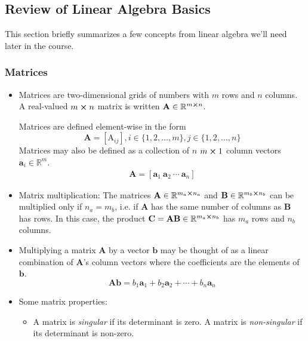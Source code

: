\documentclass[11pt, a4paper]{article}
\newcommand{\R}{\mathbb{R}} %
\newcommand{\mat}[1]{\mathbf{#1}} %
\begin{document}
\subsection{Review of Linear Algebra Basics}
This section briefly summarizes a few concepts from linear algebra we'll need later in the course.
\subsubsection{Matrices}
\begin{itemize}
	\item Matrices are two-dimensional grids of numbers with $ m $ rows and $ n $ columns. A real-valued $ m \cross n $ matrix is written $ \mat{A} \in \R^{m\cross n} $. 
	
	Matrices are defined element-wise in the form 
	\begin{equation*}
		 \mat{A} = [\mathrm{A}_{ij}],  i \in \{1, 2, \dots, m\}, j \in \{1,2, \dots, n\} 
	\end{equation*}
	Matrices may also be defined as a collection of $ n $  $ m \cross 1 $ column vectors $ \bm{a}_i \in \R^{m} $.
	\begin{align*}
		\mat{A} = [\bm{a}_1 \ \bm{a}_2 \ \cdots \ \bm{a}_n]
	\end{align*}
	
	\item Matrix multiplication: The matrices $ \mat{A} \in \R^{m_{a} \cross n_{a}}$ and $ \mathbf{B} \in \R^{m_{b} \cross n_{b}} $ can be multiplied only if $ n_{a} = m_{b} $, i.e. if $ \mat{A} $ has the same number of columns as $ \mathbf{B} $ has rows. In this case, the product $ \mat{C} = \mat{A} \mat{B} \in \R^{m_{a} \cross n_{b}} $ has $ m_{a} $ rows and $ n_{b} $ columns.
	
	\item Multiplying a matrix $ \mathbf{A} $ by a vector $ \bm{b} $ may be thought of as a linear combination of $ \mat{A} $'s column vectors where the coefficients are the elements of $ \bm{b} $.
	\begin{equation*}
		\mat{A} \bm{b} = b_1 \bm{a}_1 + b_2 \bm{a}_2 + \cdots + b_n \bm{a}_n
	\end{equation*}
	
	\item Some matrix properties:
	\begin{itemize}
		\item A matrix is \textit{singular} if its determinant is zero. A matrix is \textit{non-singular} if its determinant is non-zero.
		

\end{itemize}
\end{itemize}
\end{document}
